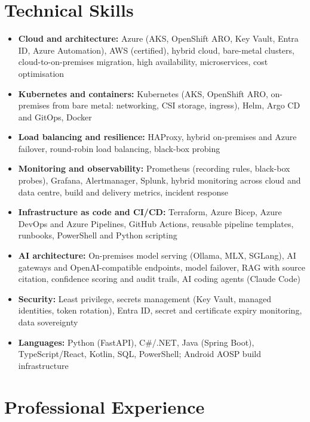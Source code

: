 \documentclass[a4paper,10pt]{article}
\begin{document}
\section*{Technical Skills}
\begin{itemize}
  \item \textbf{Cloud and architecture:} Azure (AKS, OpenShift ARO, Key Vault, Entra ID, Azure Automation), AWS (certified), hybrid cloud, bare-metal clusters, cloud-to-on-premises migration, high availability, microservices, cost optimisation
  \item \textbf{Kubernetes and containers:} Kubernetes (AKS, OpenShift ARO, on-premises from bare metal: networking, CSI storage, ingress), Helm, Argo CD and GitOps, Docker
  \item \textbf{Load balancing and resilience:} HAProxy, hybrid on-premises and Azure failover, round-robin load balancing, black-box probing
  \item \textbf{Monitoring and observability:} Prometheus (recording rules, black-box probes), Grafana, Alertmanager, Splunk, hybrid monitoring across cloud and data centre, build and delivery metrics, incident response
  \item \textbf{Infrastructure as code and CI/CD:} Terraform, Azure Bicep, Azure DevOps and Azure Pipelines, GitHub Actions, reusable pipeline templates, runbooks, PowerShell and Python scripting
  \item \textbf{AI architecture:} On-premises model serving (Ollama, MLX, SGLang), AI gateways and OpenAI-compatible endpoints, model failover, RAG with source citation, confidence scoring and audit trails, AI coding agents (Claude Code)
  \item \textbf{Security:} Least privilege, secrets management (Key Vault, managed identities, token rotation), Entra ID, secret and certificate expiry monitoring, data sovereignty
  \item \textbf{Languages:} Python (FastAPI), C\#/.NET, Java (Spring Boot), TypeScript/React, Kotlin, SQL, PowerShell; Android AOSP build infrastructure
\end{itemize}

\section*{Professional Experience}
\end{document}
